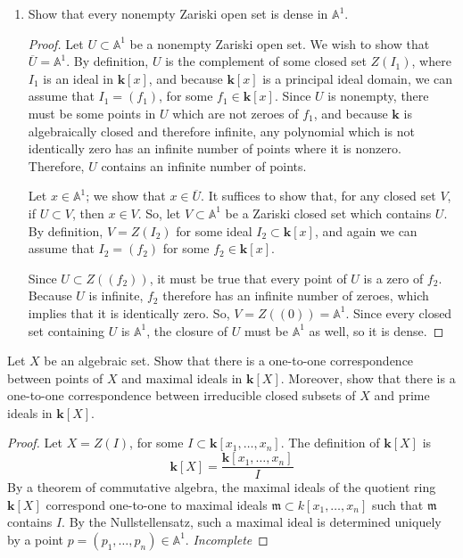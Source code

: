 \documentclass[12pt]{article}
\theoremstyle{definition}
\newenvironment{problem}[2][Problem]{\begin{trivlist}
\item[\hskip \labelsep {\bfseries #1}\hskip \labelsep {\bfseries #2.}]}{\end{trivlist}}
\begin{document}
\begin{problem}{2}
\begin{enumerate}
\begin{proof}
\end{proof}
\item Show that every nonempty Zariski open set is dense in $\mathbb A^1$.
\begin{proof}
Let $U \subset \mathbb A^1$ be a nonempty Zariski open set. We wish to show that $\overline U = \mathbb A^1$. By definition, $U$ is the complement of some closed set $Z(I_1)$, where $I_1$ is an ideal in $\mathbf k[x]$, and because $\mathbf k[x]$ is a principal ideal domain, we can assume that $I_1 = (f_1)$, for some $f_1 \in \mathbf k[x]$. Since $U$ is nonempty, there must be some points in $U$ which are not zeroes of $f_1$, and because $\mathbf k$ is algebraically closed and therefore infinite, any polynomial which is not identically zero has an infinite number of points where it is nonzero. Therefore, $U$ contains an infinite number of points.
\par Let $x \in \mathbb A^1$; we show that $x \in \overline U$. It suffices to show that, for any closed set $V$, if $U \subset V$, then $x \in V$. So, let $V \subset \mathbb A^1$ be a Zariski closed set which contains $U$. By definition, $V = Z(I_2)$ for some ideal $I_2 \subset \mathbf k[x]$, and again we can assume that $I_2 = (f_2)$ for some $f_2 \in \mathbf k [x]$. 
\par Since $U \subset Z((f_2))$, it must be true that every point of $U$ is a zero of $f_2$. Because $U$ is infinite, $f_2$ therefore has an infinite number of zeroes, which implies that it is identically zero. So, $V = Z((0)) = \mathbb A^1$. Since every closed set containing $U$ is $\mathbb A^1$, the closure of $U$ must be $\mathbb A^1$ as well, so it is dense.
\end{proof}
\end{enumerate}
\end{problem}
\begin{problem}{3}
Let $X$ be an algebraic set. Show that there is a one-to-one correspondence between points of $X$ and maximal ideals in $\mathbf{k}[X]$. Moreover, show that there is a one-to-one correspondence between irreducible closed subsets of $X$ and prime ideals in $\mathbf{k}[X]$.
\begin{proof}
Let $X = Z(I)$, for some $I \subset \mathbf k [x_1, \dots, x_n]$. The definition of $\mathbf k [X]$ is
\[
    \mathbf k[X] = \frac{\mathbf k[x_1, \dots, x_n]}{I}
\]
By a theorem of commutative algebra, the maximal ideals of the quotient ring $\mathbf k[X]$ correspond one-to-one to maximal ideals $\mathfrak m \subset k[x_1, \dots, x_n]$ such that $\mathfrak m$ contains $I$. By the Nullstellensatz, such a maximal ideal is determined uniquely by a point $p = (p_1, \dots, p_n) \in \mathbb A^1$.
\textit{Incomplete}
\end{proof}
\end{problem}
\end{document}
